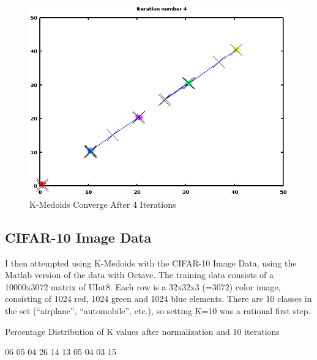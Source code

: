 \documentclass[11pt, oneside]{article}   	%
\begin{document}
\begin{figure}[h!]
\centering
\includegraphics[scale=0.6]{K-Medoid}
\caption{K-Medoids Converge After 4 Iterations}
\end{figure}

\subsection*{CIFAR-10 Image Data}

I then attempted using K-Medoids with the CIFAR-10 Image Data, using the Matlab version of the data with Octave. The training data consists of a 10000x3072 matrix of UInt8. Each row is a 32x32x3 (=3072) color image, consisting of 1024 red, 1024 green and 1024 blue elements. There are 10 classes in the set (``airplane'', ``automobile'', etc.), so setting K=10 was a rational first step.

Percentage Distribution of K values after normalization and 10 iterations

06
05
04
26
14
13
05
04
03
15
\end{document}
